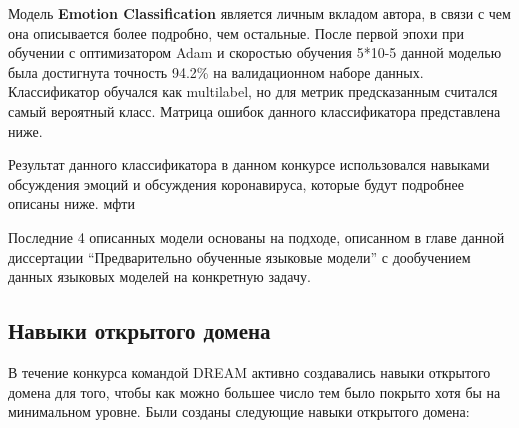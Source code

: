 Модель \textbf{Emotion Classification} является личным вкладом автора, в связи с чем она описывается более подробно, чем остальные. После первой эпохи при обучении с оптимизатором Adam и скоростью обучения 5*10-5 данной моделью была достигнута точность 94.2\% на валидационном наборе данных. Классификатор обучался как multilabel, но для метрик предсказанным считался самый вероятный класс. Матрица ошибок данного классификатора представлена ниже.


\begin{table}[htbp]
\centering
\caption {Матрица ошибок классификатора эмоций, использовавшегося в "Alexa Prize Challenge 3"}
\label{tab:dream1}%
\end{table}



Результат данного классификатора в данном конкурсе использовался навыками обсуждения эмоций и обсуждения коронавируса, которые будут подробнее описаны ниже.
мфти 

Последние 4 описанных модели основаны на подходе, описанном в главе данной диссертации “Предварительно обученные языковые модели” с дообучением данных языковых моделей на конкретную задачу. 

\subsection{Навыки открытого домена}

В течение конкурса командой DREAM активно создавались навыки открытого домена для того, чтобы как можно большее число тем было покрыто хотя бы на минимальном уровне. Были созданы следующие навыки открытого домена:

